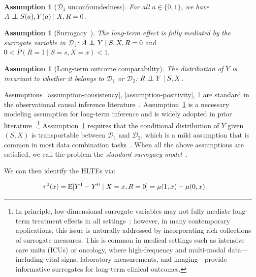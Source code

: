 \documentclass{article}
\theoremstyle{plain}
\theoremstyle{definition}
\newtheorem{assumption}[theorem]{Assumption}
\theoremstyle{remark}
\newcommand{\indep}{\mathrel{\perp\mspace{-10mu}\perp}} %
\newcommand{\1}{\mathds{1}}                %
\begin{document}
\begin{assumption}[$\mathcal{D}_1$ unconfoundedness]
\label{assumption-unconf} \emph{For all $a \in \{0,1\}$, we have} $A \indep S(a), Y(a) \mid X, R=0$.
\end{assumption}

\begin{assumption}[Surrogacy~\cite{Prentice.1989}]
\label{assumption-surrogacy} \emph{The long-term effect is fully mediated by the surrogate variable in $\mathcal{D}_1$:} $A \indep Y \mid S, X,R=0$ and $0 < P(R=1 \mid S=s,X=x) < 1$.
\end{assumption}
\begin{assumption}[Long-term outcome comparability]
\label{assumption-compara} \emph{The distribution of $Y$ is invariant to whether it belongs to $\mathcal{D}_1$ or $\mathcal{D}_2$:} $R \indep Y \mid S, X$.
\end{assumption}
Assumptions~\ref{assumption-consistency}, \ref{assumption-positivity}, \ref{assumption-unconf} are standard in the observational causal inference literature~\cite{Rubin.1974, Imbens.1994, Kallus.2025, Athey.2025}. Assumption~\ref{assumption-surrogacy} is a necessary modeling assumption for long-term inference and is widely adopted in prior literature~\citep{Athey.2025, Chen.2023, Yang.2024-Targeting, Kallus.2025}.\footnote{In principle, low-dimensional surrogate variables may not fully mediate long-term treatment effects in all settings~\citep{Freedman.1992}; however, in many contemporary applications, this issue is naturally addressed by incorporating rich collections of surrogate measures. This is common in medical settings such as intensive care units (ICUs) or oncology, where high-frequency and multi-modal data---including vital signs, laboratory measurements, and imaging---provide informative surrogates for long-term clinical outcomes.} Assumption~\ref{assumption-compara} requires that the conditional distribution of $Y$ given $(S,X)$ is transportable between $\mathcal{D}_1$ and $\mathcal{D}_2$, which is a mild assumption that is common in most data combination tasks~\cite{Athey.2025, Chen.2023, Yang.2024-Targeting}. When all the above assumptions are satisfied, we call the problem the \emph{standard surrogacy model}~\cite{Chen.2023}. 

We can then identify the HLTEs via:

\vspace{-0.5cm}
\footnotesize
\begin{align}
    \label{eq:identification-tau0}
    \hspace{-0.4cm}
    \tau^0(x)=\mathbb{E}[Y^1-Y^0 \mid X=x,R=0]=\mu(1,x)-\mu(0,x).
    \hspace{-0.1cm}
\end{align}
\vspace{-0.5cm}
\normalsize
\end{document}
